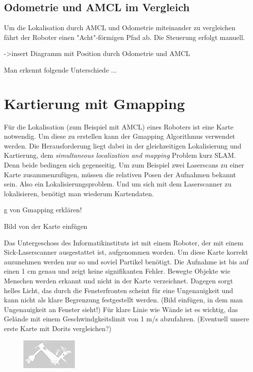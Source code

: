 \documentclass[11pt,a4paper]{article}
\begin{document}
{\subsection{Odometrie und AMCL im Vergleich}
Um die Lokalisation durch AMCL und Odometrie miteinander zu vergleichen f\"ahrt der Roboter einen "Acht"-f\"ormigen Pfad ab. Die Steuerung erfolgt manuell.  

->insert Diagramm mit Position durch Odometrie und AMCL 


Man erkennt folgende Unterschiede ...


\section{Kartierung mit Gmapping} \cite{gmapping}
F\"ur die Lokalisation (zum Beispiel mit AMCL) eines Roboters ist eine Karte notwendig. Um diese zu erstellen kann der Gmapping Algorithmus verwendet werden. Die Herausforderung liegt dabei in der gleichzeitigen Lokalisierung und Kartierung, dem \textit{simultaneous localization and mapping} Problem kurz SLAM. Denn beide bedingen sich gegenseitig. Um zum Beispiel zwei Laserscans zu einer Karte zusammenzuf\"ugen, m\"ussen die relativen Posen der Aufnahmen bekannt sein. Also ein Lokalisierungsproblem. Und um sich mit dem Laserscanner zu lokalisieren, benötigt man wiederum Kartendaten. 



g von Gmapping erklären!


Bild von der Karte einfügen

Das Untergeschoss des Informatikinstituts ist mit einem Roboter, der mit einem Sick-Laserscanner ausgestattet ist, aufgenommen worden. Um diese Karte korrekt auzunehmen werden nur so und soviel Partikel ben\"otigt. Die Aufnahme ist bis auf einen 1 cm genau und zeigt keine signifikanten Fehler. Bewegte Objekte wie Menschen werden erkannt und nicht in der Karte verzeichnet. Dagegen sorgt helles Licht, das durch die Fensterfronten scheint f\"ur eine Ungenauigkeit und kann nicht als klare Begrenzung festgestellt werden.
(Bild einfügen, in dem man Ungenauigkeit an Fenster sieht!) F\"ur klare Linie wie W\"ande ist es wichtig, das Gel\"ande mit einem Geschwindgkeitslimit von 1 m/s abzufahren. (Eventuell unsere erste Karte mit Dorits vergleichen?)

\begin{figure}[h]
\includegraphics[width=0.25\textwidth]{pictures/firstMap.jpeg}
\end{figure}

}
\end{document}
